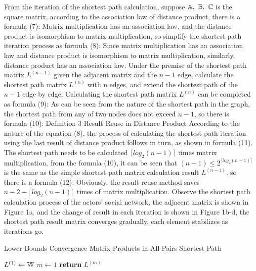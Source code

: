 \documentclass[review]{cvpr}
\begin{document}
From the iteration of the shortest path calculation, suppose \(\Bbb A,\ \Bbb B,\ \Bbb C\) is the square matrix, according to the association law of distance product, there is a formula (7):
Matrix multiplication has an association law, and the distance product is isomorphism to matrix multiplication, so simplify the shortest path iteration process as formula (8):
Since matrix multiplication has an association law and distance product is isomorphism to matrix multiplication, similarly, distance product has an association law.
Under the premise of the shortest path matrix $L^{(n-1)}$ given the adjacent matrix and the $n-1$ edge, calculate the shortest path matrix $L^{(n)}$ with n edges, and extend the shortest path of the $n-1$ edge by edge.
Calculating the shortest path matrix $L^{(n)}$ can be completed as formula (9):
As can be seen from the nature of the shortest path in the graph, the shortest path from any of two nodes does not exceed $n-1$, so there is formula (10):
Definition 3 Result Reuse in Distance Product According to the nature of the equation (8), the process of calculating the shortest path iteration using the last result of distance product follows in turn, as shown in formula (11).
The shortest path needs to be calculated $\lceil{log_2(n-1)}\rceil$ times matrix multiplication, from the formula (10), it can be seen that $(n-1)\leq2^{\lceil{log_2(n-1)}\rceil}$ is the same as the simple shortest path matrix calculation result $L^{(n-1)}$, so there is a formula (12):
Obviously, the result reuse method saves $n-2-\lceil{log_2(n-1)}\rceil$ times of matrix multiplication.
Observe the shortest path calculation process of the actors' social network, the adjacent matrix is shown in Figure 1a, and the change of result in each iteration is shown in Figure 1b-d, the shortest path result matrix converges gradually, each element stabilizes as iterations go.


\begin{algorithm}
\caption{Lower Bounds Convergence Matrix Products in All-Pairs Shortest Path}\label{algorithm}
  $L^{(1)}\leftarrow \Bbb W$\;
  $m\leftarrow 1$\;
  {\bf return} $L^{(m)}$\;
\end{algorithm}
\end{document}
